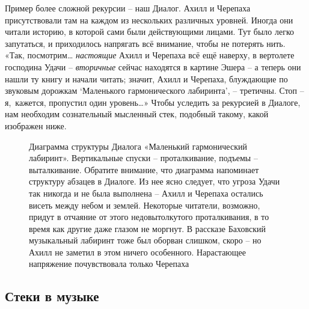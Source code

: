 \documentclass[../main.tex]{subfiles}
\begin{document}
Пример более сложной рекурсии \--- наш Диалог. Ахилл и Черепаха присутствовали там на каждом из нескольких различных уровней. Иногда они читали историю, в которой сами были действующими лицами. Тут было легко запутаться, и приходилось напрягать всё внимание, чтобы не потерять нить. «Так, посмотрим\ldots{} \emph{настоящие} Ахилл и Черепаха всё ещё наверху, в вертолете господина Удачи \--- \emph{вторичные} сейчас находятся в картине Эшера \--- а теперь они нашли ту книгу и начали читать; значит, Ахилл и Черепаха, блуждающие по звуковым дорожкам \enquote*{Маленького гармонического лабиринта}, \--- третичны. Стоп \--- я,~кажется, пропустил один уровень\ldots» Чтобы уследить за рекурсией в Диалоге, нам необходим сознательный мысленный стек, подобный такому, какой изображен ниже.

\begin{figure}
    \centering
    \begin{adjustbox}{max width=\linewidth}
        
    \end{adjustbox}
    \caption{Диаграмма структуры Диалога «Маленький гармонический лабиринт». Вертикальные спуски \--- проталкивание, подъемы \--- выталкивание. Обратите внимание, что диаграмма напоминает структуру абзацев в Диалоге. Из нее ясно следует, что угроза Удачи так никогда и не была выполнена \--- Ахилл и Черепаха остались висеть между небом и землей. Некоторые читатели, возможно, придут в отчаяние от этого недовытолкутого проталкивания, в то время как другие даже глазом не моргнут. В рассказе Баховский музыкальный лабиринт тоже был оборван слишком, скоро \--- но Ахилл не заметил в этом ничего особенного. Нарастающее напряжение почувствовала только Черепаха}
    \label{fig:diagram-dialogue-labirinth}
\end{figure}


\subsection{Стеки в музыке}
\end{document}
